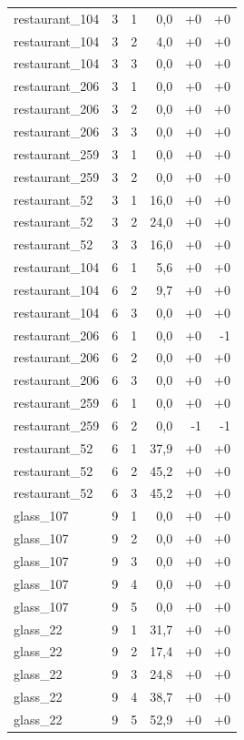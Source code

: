 \begin{longtable}{@{}llrrrr@{}}
restaurant\_104 & 3 & 1 & 0,0 & +0 & +0 \\
restaurant\_104 & 3 & 2 & 4,0 & +0 & +0 \\
restaurant\_104 & 3 & 3 & 0,0 & +0 & +0 \\
restaurant\_206 & 3 & 1 & 0,0 & +0 & +0 \\
restaurant\_206 & 3 & 2 & 0,0 & +0 & +0 \\
restaurant\_206 & 3 & 3 & 0,0 & +0 & +0 \\
restaurant\_259 & 3 & 1 & 0,0 & +0 & +0 \\
restaurant\_259 & 3 & 2 & 0,0 & +0 & +0 \\
restaurant\_52 & 3 & 1 & 16,0 & +0 & +0 \\
restaurant\_52 & 3 & 2 & 24,0 & +0 & +0 \\
restaurant\_52 & 3 & 3 & 16,0 & +0 & +0 \\
restaurant\_104 & 6 & 1 & 5,6 & +0 & +0 \\
restaurant\_104 & 6 & 2 & 9,7 & +0 & +0 \\
restaurant\_104 & 6 & 3 & 0,0 & +0 & +0 \\
restaurant\_206 & 6 & 1 & 0,0 & +0 & -1 \\
restaurant\_206 & 6 & 2 & 0,0 & +0 & +0 \\
restaurant\_206 & 6 & 3 & 0,0 & +0 & +0 \\
restaurant\_259 & 6 & 1 & 0,0 & +0 & +0 \\
restaurant\_259 & 6 & 2 & 0,0 & -1 & -1 \\
restaurant\_52 & 6 & 1 & 37,9 & +0 & +0 \\
restaurant\_52 & 6 & 2 & 45,2 & +0 & +0 \\
restaurant\_52 & 6 & 3 & 45,2 & +0 & +0 \\
glass\_107 & 9 & 1 & 0,0 & +0 & +0 \\
glass\_107 & 9 & 2 & 0,0 & +0 & +0 \\
glass\_107 & 9 & 3 & 0,0 & +0 & +0 \\
glass\_107 & 9 & 4 & 0,0 & +0 & +0 \\
glass\_107 & 9 & 5 & 0,0 & +0 & +0 \\
glass\_22 & 9 & 1 & 31,7 & +0 & +0 \\
glass\_22 & 9 & 2 & 17,4 & +0 & +0 \\
glass\_22 & 9 & 3 & 24,8 & +0 & +0 \\
glass\_22 & 9 & 4 & 38,7 & +0 & +0 \\
glass\_22 & 9 & 5 & 52,9 & +0 & +0 \\

\end{longtable}
